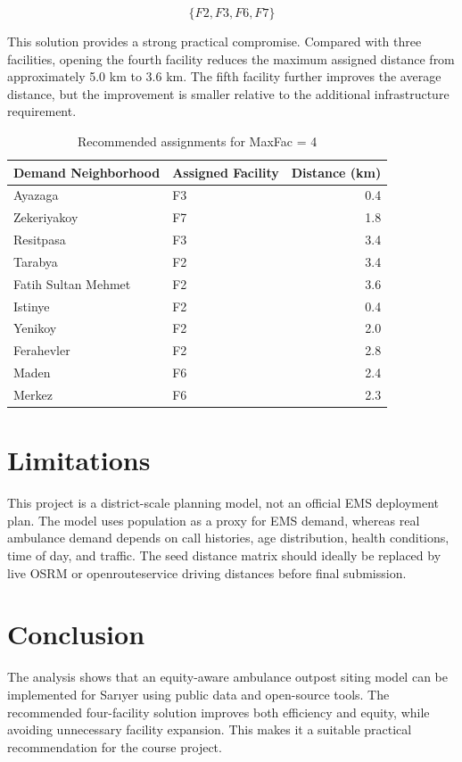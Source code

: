 \documentclass[11pt,a4paper]{article}
\begin{document}
\[
\{F2, F3, F6, F7\}
\]

This solution provides a strong practical compromise.
Compared with three facilities, opening the fourth facility reduces the maximum assigned distance from approximately 5.0 km to 3.6 km.
The fifth facility further improves the average distance, but the improvement is smaller relative to the additional infrastructure requirement.

\begin{table}[H]
\centering
\caption{Recommended assignments for MaxFac = 4}
\label{tab:assignments}
\begin{tabularx}{\textwidth}{l l r}
\toprule
Demand Neighborhood & Assigned Facility & Distance (km) \\
\midrule
Ayazaga & F3 & 0.4 \\
Zekeriyakoy & F7 & 1.8 \\
Resitpasa & F3 & 3.4 \\
Tarabya & F2 & 3.4 \\
Fatih Sultan Mehmet & F2 & 3.6 \\
Istinye & F2 & 0.4 \\
Yenikoy & F2 & 2.0 \\
Ferahevler & F2 & 2.8 \\
Maden & F6 & 2.4 \\
Merkez & F6 & 2.3 \\
\bottomrule
\end{tabularx}
\end{table}

\section{Limitations}

This project is a district-scale planning model, not an official EMS deployment plan.
The model uses population as a proxy for EMS demand, whereas real ambulance demand depends on call histories, age distribution, health conditions, time of day, and traffic.
The seed distance matrix should ideally be replaced by live OSRM or openrouteservice driving distances before final submission.

\section{Conclusion}

The analysis shows that an equity-aware ambulance outpost siting model can be implemented for Sar{\i}yer using public data and open-source tools.
The recommended four-facility solution improves both efficiency and equity, while avoiding unnecessary facility expansion.
This makes it a suitable practical recommendation for the course project.



\end{document}
